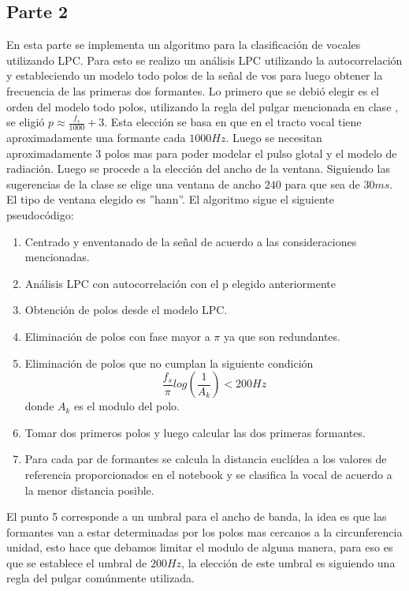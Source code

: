 \documentclass[a4paper]{article}
\begin{document}
\subsection{Parte 2}
En esta parte se implementa un algoritmo para la clasificación de vocales utilizando LPC. 
Para esto se realizo un análisis LPC utilizando la autocorrelación y estableciendo un modelo todo polos de la señal de vos para luego obtener la frecuencia de las primeras dos formantes. Lo primero que se debió elegir es el orden del modelo todo polos, utilizando la regla del pulgar mencionada en clase \cite{of22}, se eligió $p \approx \frac{f_s}{1000}+3$. Esta elección se basa en que en el tracto vocal tiene aproximadamente una formante cada $1000Hz$. Luego se necesitan aproximadamente $3$ polos mas para poder modelar el pulso glotal y el modelo de radiación. 
Luego se procede a la elección del ancho de la ventana. Siguiendo las sugerencias de la clase \cite{of22} se elige una ventana de ancho $240$ para que sea de $30ms$. El tipo de ventana elegido es ''hann''. 
El algoritmo sigue el siguiente pseudocódigo:
\begin{enumerate}
    \item Centrado y enventanado de la señal de acuerdo a las consideraciones mencionadas.
    \item Análisis LPC con autocorrelación con el p elegido anteriormente
    \item Obtención de polos desde el modelo LPC. 
    \item Eliminación de polos con fase mayor a $\pi$ ya que son redundantes.
    \item Eliminación de polos que no cumplan la siguiente condición
    $$\frac{f_s}{\pi}log(\frac{1}{A_k})<200Hz$$
    donde $A_k$ es el modulo del polo.
    \item Tomar dos primeros polos y luego calcular las dos primeras formantes. 
    \item Para cada par de formantes se calcula la distancia euclídea a los valores de referencia proporcionados en el notebook y se clasifica la vocal de acuerdo a la menor distancia posible.
\end{enumerate}

El punto 5 corresponde a un umbral para el ancho de banda, la idea es que las formantes van a estar determinadas por los polos mas cercanos a la circunferencia unidad, esto hace que debamos limitar el modulo de alguna manera,  para eso es que se establece el umbral de $200Hz$, la elección de este umbral es siguiendo una regla del pulgar comúnmente utilizada. 
\end{document}
